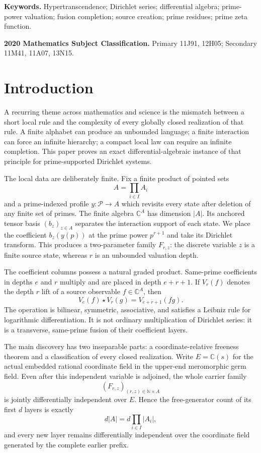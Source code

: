 \documentclass[11pt]{article}
\theoremstyle{definition}
\theoremstyle{remark}
\newcommand{\C}{\mathbb C}
\newcommand{\N}{\mathbb N}
\newcommand{\cP}{\mathcal P}
\begin{document}
\noindent\textbf{Keywords.}
Hypertranscendence; Dirichlet series; differential algebra; prime-power valuation;
fusion completion; source creation; prime residues; prime zeta function.

\medskip
\noindent\textbf{2020 Mathematics Subject Classification.}
Primary 11J91, 12H05; Secondary 11M41, 11A07, 13N15.

\section{Introduction}\label{sec:introduction}

A recurring theme across mathematics and science is the mismatch between a short local rule and
the complexity of every globally closed realization of that rule.  A finite alphabet can produce
an unbounded language; a finite interaction can force an infinite hierarchy; a compact local law
can require an infinite completion.  This paper proves an exact differential-algebraic instance
of that principle for prime-supported Dirichlet systems.

The local data are deliberately finite.  Fix a finite product of pointed sets
\[
 A=\prod_{i\in I}A_i
\]
and a prime-indexed profile \(y:\cP\to A\) which revisits every state after deletion of any
finite set of primes.  The finite algebra \(\C^A\) has dimension \(|A|\).  Its anchored tensor
basis \((b_z)_{z\in A}\) separates the interaction support of each state.  We place the
coefficient \(b_z(y(p))\) at the prime power \(p^{r+1}\) and take its Dirichlet transform.  This
produces a two-parameter family \(F_{r,z}\): the discrete variable \(z\) is a finite source state,
whereas \(r\) is an unbounded valuation depth.

The coefficient columns possess a natural graded product.  Same-prime coefficients in depths
\(e\) and \(r\) multiply and are placed in depth \(e+r+1\).  If \(V_r(f)\) denotes the depth
\(r\) lift of a source observable \(f\in\C^A\), then
\begin{equation}\label{eq:fusion-intro}
 V_e(f)\star V_r(g)=V_{e+r+1}(fg).
\end{equation}
The operation is bilinear, symmetric, associative, and satisfies a Leibniz rule for logarithmic
differentiation.  It is not ordinary multiplication of Dirichlet series: it is a transverse,
same-prime fusion of their coefficient layers.

The main discovery has two inseparable parts: a coordinate-relative freeness theorem and a
classification of every closed realization.  Write \(E=\C(s)\) for the actual embedded rational
coordinate field in the upper-end meromorphic germ field.  Even after this independent variable
is adjoined, the whole carrier family
\[
 (F_{r,z})_{(r,z)\in\N\times A}
\]
is jointly differentially independent over \(E\).  Hence the free-generator count of its first
\(d\) layers is exactly
\begin{equation}\label{eq:rank-intro}
 d|A|=d\prod_{i\in I}|A_i|,
\end{equation}
and every new layer remains differentially independent over the coordinate field generated by
the complete earlier prefix.
\end{document}
